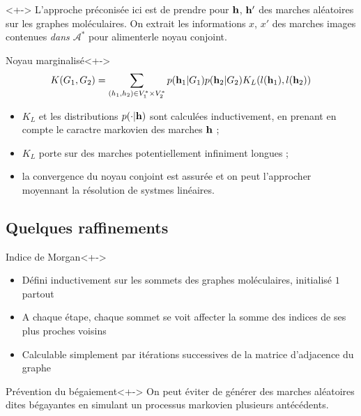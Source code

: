 \begin{frame}
\begin{block}{}<+->
L'approche pr\'econis\'ee ici est de prendre pour $\mathbf{h}$, $\mathbf{h}'$ des marches al\'eatoires sur les graphes mol\'eculaires. %
On extrait les informations $x$, $x'$ des marches images contenues \emph{dans $\mathcal{A}^{\ast}$} pour alimenterle noyau conjoint.
\end{block}
\begin{block}{Noyau marginalis\'e}<+->
\[K(G_1,G_2) = \sum\limits_{(h_1,h_2) \in V_1^{\ast} \times V_2^{\ast}}p(\mathbf{h}_1|G_1)p(\mathbf{h}_2|G_2)K_L(l(\mathbf{h}_1),l(\mathbf{h}_2))\]
\end{block}
\end{frame}

\begin{frame}
\begin{itemize}
\item<+-> $K_L$ et les distributions $p(\cdot |\mathbf{h})$ sont calcul\'ees inductivement, en prenant en compte le caractre markovien des marches $\mathbf{h}$ ;
\item<+-> $K_L$ porte sur des marches potentiellement infiniment longues ;
\item<+-> la convergence du noyau conjoint est assur\'ee et on peut l'approcher moyennant la r\'esolution de systmes lin\'eaires.
\end{itemize}
\end{frame}

\subsection{Quelques raffinements}

\begin{frame}
\begin{block}{Indice de Morgan}<+->
\begin{itemize}
\item<+-> D\'efini inductivement sur les sommets des graphes mol\'eculaires, initialis\'e  $1$ partout
\item<+-> A chaque \'etape, chaque sommet se voit affecter la somme des indices de ses plus proches voisins
\item<+-> Calculable simplement par it\'erations successives de la matrice d'adjacence du graphe
\end{itemize}
\end{block}
\begin{block}{Pr\'evention du b\'egaiement}<+->
On peut \'eviter de g\'en\'erer des marches al\'eatoires dites b\'egayantes en simulant un processus markovien  plusieurs ant\'ec\'edents.
\end{block}
\end{frame}

